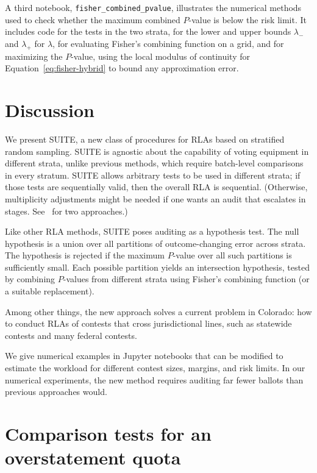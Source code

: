 \documentclass[runningheads]{llncs}
\begin{document}
A third notebook, \texttt{fisher\_combined\_pvalue}, illustrates the numerical methods used
to check whether the maximum combined $P$-value is below the risk limit.
It includes code for the tests in the two strata,
for the lower and upper bounds $\lambda_-$ and $\lambda_+$ for $\lambda$,
for evaluating Fisher's combining function on a grid,
and for maximizing the $P$-value, using the local modulus of continuity
for Equation~\ref{eq:fisher-hybrid} to bound any approximation error.

\section{Discussion} \label{sec:discussion}

We present SUITE, a new class of procedures for RLAs based on stratified random sampling.
SUITE is agnostic about the capability of voting equipment in different strata, unlike
previous methods, which require batch-level comparisons in every stratum.
SUITE allows arbitrary tests to be used in different strata; if those tests are sequentially valid, then the overall RLA is sequential. 
(Otherwise, multiplicity adjustments might be needed if one wants an audit that escalates in stages.
See~\cite{stark08a,stark09a} for two approaches.)

Like other RLA methods, SUITE poses auditing as a hypothesis test.
The null hypothesis is a union over all partitions of outcome-changing error across strata.
The hypothesis is rejected if the maximum $P$-value over all such partitions is sufficiently
small.
Each possible partition yields an intersection hypothesis, tested by
combining $P$-values from different strata using Fisher's combining function (or a suitable
replacement). 

Among other things, the new approach solves a current problem in Colorado:
how to conduct RLAs of contests that cross jurisdictional lines, such as statewide 
contests and many federal contests.

We give numerical examples in Jupyter notebooks
that can be modified to estimate the workload for different contest sizes, margins, and risk limits.
In our numerical experiments, the new method requires auditing far fewer ballots than previous approaches would. 

\appendix
\section{Comparison tests for an overstatement quota}\label{sec:appendix-comparison}
\end{document}
